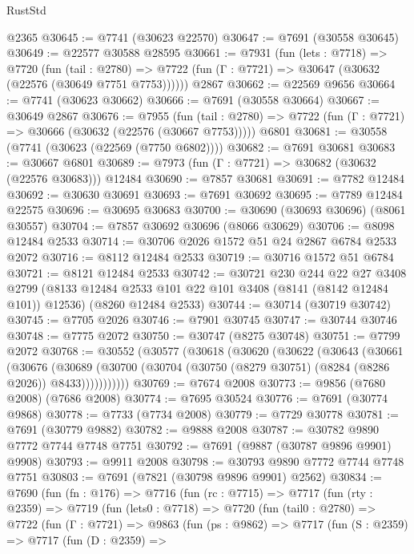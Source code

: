 \begin{lexlean}{RustStd}
\begin{coremodule}
    @2365
@30645 := @7741 (@30623 @22570)
@30647 := @7691 (@30558 @30645)
@30649 := @22577 @30588 @28595
@30661 := @7931
    (fun (lets : @7718) =>
    @7720
      (fun (tail : @2780) =>
      @7722 (fun (Γ : @7721) => @30647 (@30632 (@22576 (@30649 @7751 @7753))))))
    @2867
@30662 := @22569 @9656
@30664 := @7741 (@30623 @30662)
@30666 := @7691 (@30558 @30664)
@30667 := @30649 @2867
@30676 := @7955
    (fun (tail : @2780) => @7722 (fun (Γ : @7721) => @30666 (@30632 (@22576 (@30667 @7753)))))
    @6801
@30681 := @30558 (@7741 (@30623 (@22569 (@7750 @6802))))
@30682 := @7691 @30681
@30683 := @30667 @6801
@30689 := @7973 (fun (Γ : @7721) => @30682 (@30632 (@22576 @30683))) @12484
@30690 := @7857 @30681
@30691 := @7782 @12484
@30692 := @30630 @30691
@30693 := @7691 @30692
@30695 := @7789 @12484 @22575
@30696 := @30695 @30683
@30700 := @30690 (@30693 @30696) (@8061 @30557)
@30704 := @7857 @30692 @30696 (@8066 @30629)
@30706 := @8098 @12484 @2533
@30714 := @30706 @2026 @1572 @51 @24 @2867 @6784 @2533 @2072
@30716 := @8112 @12484 @2533
@30719 := @30716 @1572 @51 @6784
@30721 := @8121 @12484 @2533
@30742 := @30721
    @230
    @244
    @22
    @27
    @3408
    @2799
    (@8133 @12484 @2533 @101 @22 @101 @3408 (@8141 (@8142 @12484 @101)) @12536)
    (@8260 @12484 @2533)
@30744 := @30714 (@30719 @30742)
@30745 := @7705 @2026
@30746 := @7901 @30745
@30747 := @30744 @30746
@30748 := @7775 @2072
@30750 := @30747 (@8275 @30748)
@30751 := @7799 @2072
@30768 := @30552
    (@30577
      (@30618
        (@30620
          (@30622
            (@30643
              (@30661
                (@30676
                  (@30689
                    (@30700 (@30704 (@30750 (@8279 @30751) (@8284 (@8286 @2026)) @8433)))))))))))
@30769 := @7674 @2008
@30773 := @9856 (@7680 @2008) (@7686 @2008)
@30774 := @7695 @30524
@30776 := @7691 (@30774 @9868)
@30778 := @7733 (@7734 @2008)
@30779 := @7729 @30778
@30781 := @7691 (@30779 @9882)
@30782 := @9888 @2008
@30787 := @30782 @9890 @7772 @7744 @7748 @7751
@30792 := @7691 (@9887 (@30787 @9896 @9901) @9908)
@30793 := @9911 @2008
@30798 := @30793 @9890 @7772 @7744 @7748 @7751
@30803 := @7691 (@7821 (@30798 @9896 @9901) @2562)
@30834 := @7690
    (fun (fn : @176) =>
    @7716
      (fun (rc : @7715) =>
      @7717
        (fun (rty : @2359) =>
        @7719
          (fun (lets0 : @7718) =>
          @7720
            (fun (tail0 : @2780) =>
            @7722
              (fun (Γ : @7721) =>
              @9863
                (fun (ps : @9862) =>
                @7717
                  (fun (S : @2359) =>
                  @7717
                    (fun (D : @2359) =>

\end{coremodule}
\end{lexlean}
